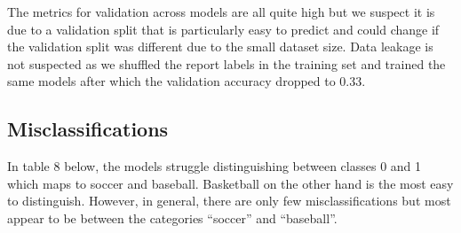 \documentclass[12pt]{article}
\begin{document}
The metrics for validation across models are all quite high but we suspect it is due to a validation split that is particularly easy to predict and could change if the validation split was different due to the small dataset size. Data leakage is not suspected as we shuffled the report labels in the training set and trained the same models after which the validation accuracy dropped to 0.33.
\begin{table}[h]
    \centering
    \caption{Comparison of Model Performance}
    \label{tab:model_comparison}
\end{table}

\subsection*{Misclassifications}

In table 8 below, the models struggle distinguishing between classes 0 and 1 which maps to soccer and baseball. Basketball on the other hand is the most easy to distinguish. However, in general, there are only few misclassifications but most appear to be between the categories ``soccer'' and ``baseball''.
\end{document}

